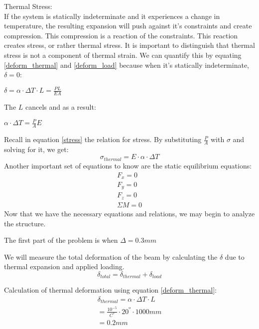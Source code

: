 \documentclass[12pt]{article}
\begin{document}
Thermal Stress:\\
If the system is statically indeterminate and it experiences a change in temperature, the resulting expansion will push against it's constraints and create compression. This compression is a reaction of the constraints. This reaction creates stress, or rather thermal stress. It is important to distinguish that thermal stress is not a component of thermal strain. We can quantify this by equating \ref{deform_thermal} and \ref{deform_load} because when it's statically indeterminate, $\delta = 0$:
\begin{center}
$\delta= \alpha \cdot \Delta T \cdot L = \frac{PL}{EA}$
\end{center}
The $L$ cancels and as a result:
\begin{center}
$\alpha \cdot \Delta T = \frac{P}{A} E$
\end{center}
Recall in equation \ref{stress} the relation for stress. By substituting $\frac{P}{A}$ with $\sigma$ and solving for it, we get:
\begin{equation} \label{thermal_stress}
\sigma_{thermal} = E \cdot  \alpha \cdot \Delta T
\end{equation}
Another important set of equations to know are the static equilibrium equations:
\begin{gather*}
F_{x} = 0\\
F_{y} = 0\\
F_{z} = 0\\
\Sigma M = 0
\end{gather*}
Now that we have the necessary equations and relations, we may begin to analyze the structure.
\pagebreak

The first part of the problem is when $\Delta = 0.3 mm$
\newline

We will measure the total deformation of the beam by calculating the $\delta$ due to thermal expansion and applied loading.
\begin{equation}
\delta_{total} = \delta_{thermal} + \delta_{load}
\end{equation}

Calculation of thermal deformation using equation \ref{deform_thermal}:
\begin{gather*} \label{deform_thermal_calc_delta03}
\delta_{thermal} = \alpha \cdot \Delta T \cdot L \\
= \frac{10^{-5}}{C^{º}} \cdot 20^{º} \cdot 1000 mm \\
 = 0.2 mm
\end{gather*}
\end{document}
